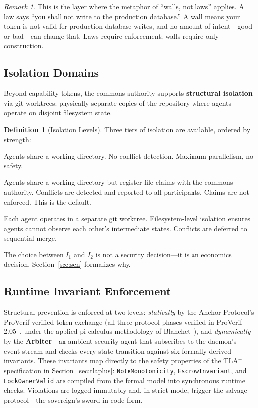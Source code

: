 \documentclass[11pt,a4paper]{article}
\theoremstyle{definition}
\newtheorem{definition}{Definition}[section]
\theoremstyle{remark}
\newtheorem*{remark}{Remark}
\begin{document}
\begin{remark}
This is the layer where the metaphor of ``walls, not laws'' applies. A law says ``you shall not write to the production database.'' A wall means your token is not valid for production database writes, and no amount of intent---good or bad---can change that. Laws require enforcement; walls require only construction.
\end{remark}

\subsection{Isolation Domains}\label{sec:isolation}

Beyond capability tokens, the commons authority supports \textbf{structural isolation} via git worktrees: physically separate copies of the repository where agents operate on disjoint filesystem state.

\begin{definition}[Isolation Levels]\label{def:isolation}
Three tiers of isolation are available, ordered by strength:
\begin{description}[nosep]
  \item[$I_0$ (None):] Agents share a working directory. No conflict detection. Maximum parallelism, no safety.
  \item[$I_1$ (Advisory):] Agents share a working directory but register file claims with the commons authority. Conflicts are detected and reported to all participants. Claims are not enforced. This is the default.
  \item[$I_2$ (Structural):] Each agent operates in a separate git worktree. Filesystem-level isolation ensures agents cannot observe each other's intermediate states. Conflicts are deferred to sequential merge.
\end{description}
\end{definition}

The choice between $I_1$ and $I_2$ is not a security decision---it is an economics decision. Section~\ref{sec:sen} formalizes why.

\subsection{Runtime Invariant Enforcement}

Structural prevention is enforced at two levels: \emph{statically} by the Anchor Protocol's ProVerif-verified token exchange (all three protocol phases verified in ProVerif 2.05~\cite{owens2026anchor}, under the applied-pi-calculus methodology of Blanchet~\cite{blanchet2016modeling}), and \emph{dynamically} by the \textbf{Arbiter}---an ambient security agent that subscribes to the daemon's event stream and checks every state transition against six formally derived invariants. These invariants map directly to the safety properties of the TLA$^{+}$ specification in Section~\ref{sec:tlaplus}: \texttt{NoteMonotonicity}, \texttt{EscrowInvariant}, and \texttt{LockOwnerValid} are compiled from the formal model into synchronous runtime checks. Violations are logged immutably and, in strict mode, trigger the salvage protocol---the sovereign's sword in code form.
\end{document}
